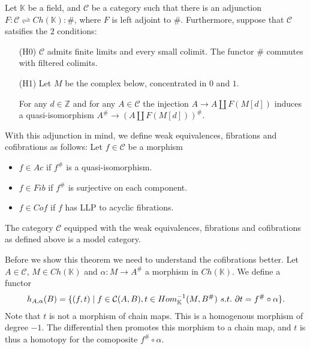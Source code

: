 \documentclass[../thesis.tex]{subfiles}
\begin{document}
            Let $\mathbb{K}$ be a field, and $\mathcal{C}$ be a category such that there is an adjunction $F:\mathcal{C}\rightleftharpoons Ch(\mathbb{K}):\#$, where $F$ is left adjoint to $\#$. Furthermore, suppose that $\mathcal{C}$ satsifies the $2$ conditions:
            \begin{itemize}
                \item[(H0)] $\mathcal{C}$ admits finite limits and every small colimit. The functor $\#$ commutes with filtered colimits.
                \item[(H1)] Let $M$ be the complex below, concentrated in $0$ and $1$.
                \begin{center}
                \end{center}
                For any $d\in \mathbb{Z}$ and for any $A\in\mathcal{C}$ the injection $A \rightarrow A \coprod F(M[d])$ induces a quasi-isomorphism $A^\# \rightarrow (A\coprod F(M[d]))^\#$.
            \end{itemize}
                
            With this adjunction in mind, we define weak equivalences, fibrations and cofibrations as follows:
            Let $f\in \mathcal{C}$ be a morphism
            \begin{itemize}
                \item $f\in Ac$ if $f^\#$ is a quasi-isomorphism.
                \item $f\in Fib$ if $f^\#$ is surjective on each component.
                \item $f\in Cof$ if $f$ has LLP to acyclic fibrations.
            \end{itemize}

            \begin{thm}
                The category $\mathcal{C}$ equipped with the weak equivalences, fibrations and cofibrations as defined above is a model category.
            \end{thm}

            Before we show this theorem we need to understand the cofibrations better. Let $A\in\mathcal{C}$, $M\in Ch(\mathbb{K})$ and $\alpha : M \rightarrow A^\#$ a morphism in $Ch(\mathbb{K})$. We define a functor 
            \begin{align*}
                h_{A,\alpha}(B) = \{(f,t)\mid f\in \mathcal{C}(A,B), t\in Hom^{-1}_\mathbb{K}(M, B^\#)\ s.t.\ \partial t = f^\#\circ\alpha\}.
            \end{align*}
            Note that $t$ is not a morphism of chain maps. This is a homogenous morphism of degree $-1$. The differential then promotes this morphism to a chain map, and $t$ is thus a homotopy for the comoposite $f^\#\circ\alpha$.
\end{document}
